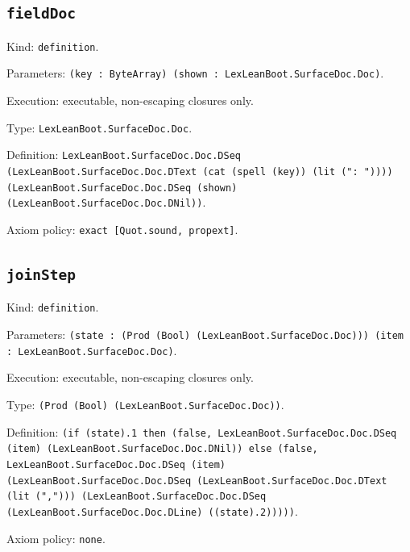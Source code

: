 \documentclass[11pt]{article}
\begin{document}
\subsection*{\texttt{fieldDoc}}
\noindent Kind: \texttt{definition}.\par
\noindent Parameters: \texttt{(key : ByteArray) (shown : LexLeanBoot.SurfaceDoc.Doc)}.\par
\noindent Execution: executable, non-escaping closures only.\par
\noindent Type: \texttt{LexLeanBoot.SurfaceDoc.Doc}.\par
\noindent Definition: \texttt{LexLeanBoot.SurfaceDoc.Doc.DSeq (LexLeanBoot.SurfaceDoc.Doc.DText (cat (spell (key)) (lit (": ")))) (LexLeanBoot.SurfaceDoc.Doc.DSeq (shown) (LexLeanBoot.SurfaceDoc.Doc.DNil))}.\par
\noindent Axiom policy: \texttt{exact [Quot.sound, propext]}.\par
\subsection*{\texttt{joinStep}}
\noindent Kind: \texttt{definition}.\par
\noindent Parameters: \texttt{(state : (Prod (Bool) (LexLeanBoot.SurfaceDoc.Doc))) (item : LexLeanBoot.SurfaceDoc.Doc)}.\par
\noindent Execution: executable, non-escaping closures only.\par
\noindent Type: \texttt{(Prod (Bool) (LexLeanBoot.SurfaceDoc.Doc))}.\par
\noindent Definition: \texttt{(if (state).1 then (false, LexLeanBoot.SurfaceDoc.Doc.DSeq (item) (LexLeanBoot.SurfaceDoc.Doc.DNil)) else (false, LexLeanBoot.SurfaceDoc.Doc.DSeq (item) (LexLeanBoot.SurfaceDoc.Doc.DSeq (LexLeanBoot.SurfaceDoc.Doc.DText (lit (","))) (LexLeanBoot.SurfaceDoc.Doc.DSeq (LexLeanBoot.SurfaceDoc.Doc.DLine) ((state).2)))))}.\par
\noindent Axiom policy: \texttt{none}.\par
\end{document}
